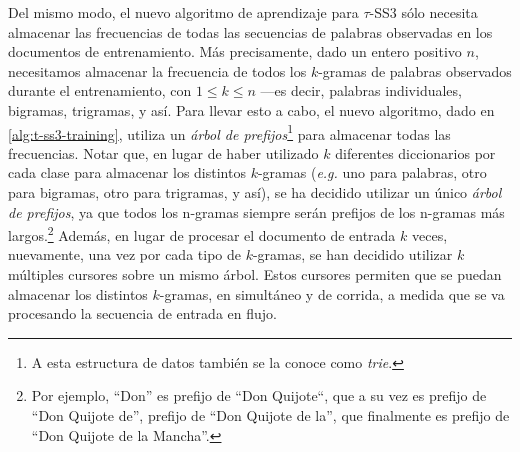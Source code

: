 Del mismo modo, el nuevo algoritmo de aprendizaje para $\tau$-SS3 sólo necesita almacenar las frecuencias de todas las secuencias de palabras observadas en los documentos de entrenamiento.
Más precisamente, dado un entero positivo $n$, necesitamos almacenar la frecuencia de todos los $k$-gramas de palabras observados durante el entrenamiento, con $1 \leq k \leq n$ ---es decir, palabras individuales, bigramas, trigramas, y así.
Para llevar esto a cabo, el nuevo algoritmo, dado en \autoref{alg:t-ss3-training}, utiliza un \emph{árbol de prefijos}\footnote{A esta estructura de datos también se la conoce como \emph{trie}.} \cite{trie1960, crochemore2009trie} para almacenar todas las frecuencias.
Notar que, en lugar de haber utilizado $k$ diferentes diccionarios por cada clase para almacenar los distintos $k$-gramas (\emph{e.g.} uno para palabras, otro para bigramas, otro para trigramas, y así), se ha decidido utilizar un único \emph{árbol de prefijos}, ya que todos los n-gramas siempre serán prefijos de los n-gramas más largos.\footnote{Por ejemplo, ``Don'' es prefijo de ``Don Quijote``, que a su vez es prefijo de ``Don Quijote de'', prefijo de ``Don Quijote de la'', que finalmente es prefijo de ``Don Quijote de la Mancha''.}
Además, en lugar de procesar el documento de entrada $k$ veces, nuevamente, una vez por cada tipo de $k$-gramas, se han decidido utilizar $k$ múltiples cursores sobre un mismo árbol. Estos cursores permiten que se puedan almacenar los distintos $k$-gramas, en simultáneo y de corrida, a medida que se va procesando la secuencia de entrada en flujo.

